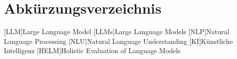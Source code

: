 \documentclass[a4paper, 12pt]{article}
\newcounter{lastromanpage}
\begin{document}

\newpage
{}
\tableofcontents
\newpage
\section*{Abkürzungsverzeichnis}
\begin{acronym}[HELM]
    [LLM]{Large Language Model}
    [LLMs]{Large Language Models}
    [NLP]{Natural Language Processing}
    [NLU]{Natural Language Understanding}
    [KI]{Künstliche Intelligenz}
    [HELM]{Holistic Evaluation of Language Models}
\end{acronym}
\newpage
\setcounter{lastromanpage}{\value{page}} %











\newpage
{}
\setcounter{page}{\value{lastromanpage}} %

\newpage
{} %
\printbibliography[title={Literaturverzeichnis}, heading=bibintoc]
\end{document}
